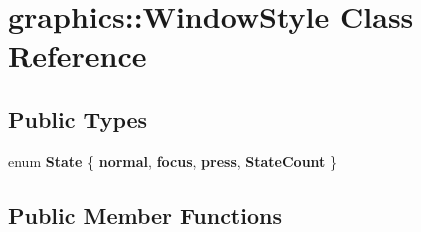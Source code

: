 \hypertarget{classgraphics_1_1_window_style}{\section{graphics\-:\-:Window\-Style Class Reference}
\label{classgraphics_1_1_window_style}
}
\subsection*{Public Types}
\begin{DoxyCompactItemize}
\item 
enum {\bfseries State} \{ {\bfseries normal}, 
{\bfseries focus}, 
{\bfseries press}, 
{\bfseries State\-Count}
 \}
\end{DoxyCompactItemize}
\subsection*{Public Member Functions}
